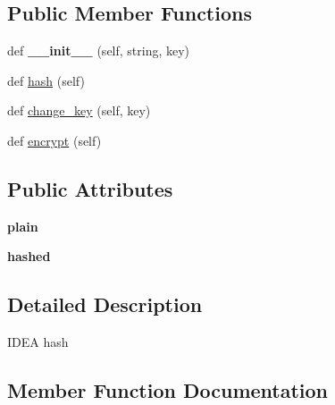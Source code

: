 \subsection*{Public Member Functions}
\begin{DoxyCompactItemize}
\item 
def {\bfseries \+\_\+\+\_\+init\+\_\+\+\_\+} (self, string, key)\hypertarget{classhal_1_1maths_1_1crypt_1_1_i_d_e_a_aeef99d9276abb6b2bd57d001c909dce6}{}\label{classhal_1_1maths_1_1crypt_1_1_i_d_e_a_aeef99d9276abb6b2bd57d001c909dce6}

\item 
def \hyperlink{classhal_1_1maths_1_1crypt_1_1_i_d_e_a_a35ca1846d9e5373e9c8ded2515926a75}{hash} (self)
\item 
def \hyperlink{classhal_1_1maths_1_1crypt_1_1_i_d_e_a_affd2617aac36358891d86f2cb1fc39c4}{change\+\_\+key} (self, key)
\item 
def \hyperlink{classhal_1_1maths_1_1crypt_1_1_i_d_e_a_a8950639a4067643433ae9db631d3c8d0}{encrypt} (self)
\end{DoxyCompactItemize}
\subsection*{Public Attributes}
\begin{DoxyCompactItemize}
\item 
{\bfseries plain}\hypertarget{classhal_1_1maths_1_1crypt_1_1_i_d_e_a_a3e7cfa1f3b0c243b2b7804b3c08e84bd}{}\label{classhal_1_1maths_1_1crypt_1_1_i_d_e_a_a3e7cfa1f3b0c243b2b7804b3c08e84bd}

\item 
{\bfseries hashed}\hypertarget{classhal_1_1maths_1_1crypt_1_1_i_d_e_a_a0c8e325b0c159234ac90d9e32006fbc8}{}\label{classhal_1_1maths_1_1crypt_1_1_i_d_e_a_a0c8e325b0c159234ac90d9e32006fbc8}

\end{DoxyCompactItemize}


\subsection{Detailed Description}
\begin{DoxyVerb}IDEA hash \end{DoxyVerb}
 

\subsection{Member Function Documentation}
